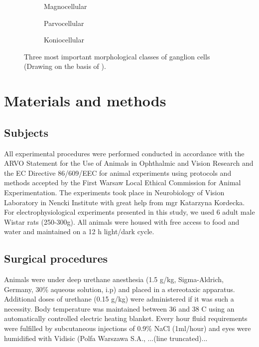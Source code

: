 \documentclass{pracalicmgr}
\begin{document}
	\begin{figure}[H]
	\begin{subfigure}{.33\textwidth}
		\centering

		\caption{Magnocellular}
		\label{rys:magno}
	\end{subfigure}%
	\begin{subfigure}{.33\textwidth}
		\centering

		\caption{Parvocellular}
		\label{rys:parvo}
	\end{subfigure}
	\begin{subfigure}{.33\textwidth}
	\centering

	\caption{Koniocellular}
	\label{rys:konio}
	\end{subfigure}
	\caption{Three most important morphological classes of ganglion cells  (Drawing on the basis of \cite{parallel}).}
	\label{rys:ganglio}
	\end{figure}
	
 
\chapter{Materials and methods}   
 	\section{Subjects}
 	All experimental procedures  were performed conducted in accordance with the ARVO Statement for the Use of Animals in Ophthalmic and Vision Research and  the EC Directive 86/609/EEC for animal experiments using protocols and methods accepted by the First Warsaw Local Ethical Commission for Animal Experimentation. The experiments took place in Neurobiology of Vision Laboratory in Nencki Institute with great help from mgr Katarzyna Kordecka.
 	For electrophysiological experiments presented in this study, we used 6 adult male Wistar rats (250-300g). All animals were housed with free access to food and water and maintained on a 12 h light/dark cycle.
 	
 	\section{Surgical procedures}
 	Animals were under deep urethane anesthesia (1.5 g/kg, Sigma-Aldrich, Germany, 30\% aqueous solution, i.p) and placed in a stereotaxic apparatus. Additional doses of urethane (0.15 g/kg) were administered if it was such a necessity. Body temperature was maintained between 36 and 38 \degree C using an automatically controlled electric heating blanket. Every hour fluid requirements were fulfilled by subcutaneous injections of 0.9\% NaCl (1ml/hour) and eyes were humidified with Vidisic (Polfa Warszawa S.A., ...(line truncated)...
 	
\end{document}

